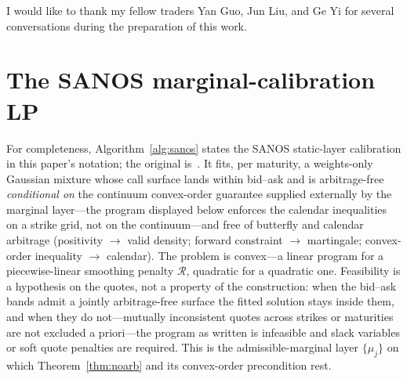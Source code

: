 \documentclass[11pt]{article}
\providecommand{\1}{\mathbf 1}
\begin{document}
I would like to thank my fellow traders Yan Guo, Jun Liu, and Ge Yi for several conversations
during the preparation of this work.

\appendix

\section{The SANOS marginal-calibration LP}
\label{app:sanoslp}

For completeness, Algorithm~\ref{alg:sanos} states the SANOS static-layer calibration in
this paper's notation; the original is~\cite{buehler2026sanos}. It fits, per maturity, a
weights-only Gaussian mixture whose call surface lands within bid--ask and is arbitrage-free
\emph{conditional on} the continuum convex-order guarantee supplied externally by the marginal
layer---the program displayed below enforces the calendar inequalities on a strike grid, not on the
continuum---and free
of butterfly and calendar arbitrage (positivity $\to$ valid density; forward constraint
$\to$ martingale; convex-order inequality $\to$ calendar). The problem is convex---a linear
program for a piecewise-linear smoothing penalty $\mathcal R$, quadratic for a quadratic
one. Feasibility is a hypothesis on the quotes, not a property of the construction: when the bid--ask
bands admit a jointly arbitrage-free surface the fitted solution stays inside them, and when they do
not---mutually inconsistent quotes across strikes or maturities are not excluded a priori---the
program as written is infeasible and slack variables or soft quote penalties are required. This is
the admissible-marginal layer $\{\mu_j\}$ on which Theorem~\ref{thm:noarb} and its convex-order
precondition rest.
\end{document}
